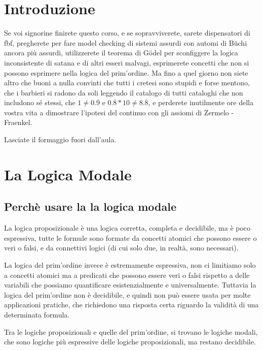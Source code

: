 
\chapter*{Introduzione}


\label{cap:introduction}



Se voi signorine finirete questo corso, e se sopravviverete, sarete
dispensatori di fbf, pregherete per fare model checking di sistemi
assurdi con automi di Büchi ancora più assurdi, utilizzerete il teorema
di Gödel per sconfiggere la logica inconsistente di satana e di altri
esseri malvagi, esprimerete concetti che non si possono esprimere
nella logica del prim'ordine. Ma fino a quel giorno non siete altro
che buoni a nulla convinti che tutti i cretesi sono stupidi e forse
mentono, che i barbieri si radono da soli leggendo il catalogo di
tutti cataloghi che non includono sé stessi, che $1\neq0.\overline{9}$
e $0.\overline{8}*10\neq8.\overline{8}$, e perderete inutilmente
ore della vostra vita a dimostrare l'ipotesi del continuo con gli
assiomi di Zermelo - Fraenkel.

Lasciate il formaggio fuori dall'aula. 


\chapter{La Logica Modale}


\section{Perchè usare la la logica modale}

La logica proposizionale è una logica corretta, completa e decidibile,
ma è poco espressiva, tutte le formule sono formate da concetti atomici
che possono essere o veri o falsi, e da connettivi logici (di cui
solo due, in realtà, sono necessari).

La logica del prim'ordine invece è estremamente espressiva, non ci
limitiamo solo a concetti atomici ma a predicati che possono essere
veri o falsi rispetto a delle variabili che possiamo quantificare
esistenzialmente e universalmente. Tuttavia la logica del prim'ordine
non è decidibile, e quindi non può essere usata per molte applicazioni
pratiche, che richiedono una risposta certa riguardo la validità di
una determinata formula.

Tra le logiche proposizionali e quelle del prim'ordine, si trovano
le logiche modali, che sono logiche più espressive delle logiche proposizionali,
ma restano decidibile.

